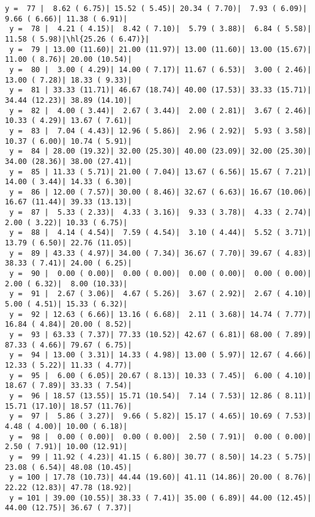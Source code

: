 \documentclass[10pt]{article}
\newcommand{\hl}[1]{\textcolor{blue}{#1}}
\begin{document}
\begin{Verbatim}[fontsize=\small, commandchars=\\\{\}]
 y =  77 |  8.62 ( 6.75)| 15.52 ( 5.45)| 20.34 ( 7.70)|  7.93 ( 6.09)|  9.66 ( 6.66)| 11.38 ( 6.91)|
 y =  78 |  4.21 ( 4.15)|  8.42 ( 7.10)|  5.79 ( 3.88)|  6.84 ( 5.58)| 11.58 ( 5.98)|\hl{25.26 ( 6.47)}|
 y =  79 | 13.00 (11.60)| 21.00 (11.97)| 13.00 (11.60)| 13.00 (15.67)| 11.00 ( 8.76)| 20.00 (10.54)|
 y =  80 |  3.00 ( 4.29)| 14.00 ( 7.17)| 11.67 ( 6.53)|  3.00 ( 2.46)| 13.00 ( 7.28)| 18.33 ( 9.33)|
 y =  81 | 33.33 (11.71)| 46.67 (18.74)| 40.00 (17.53)| 33.33 (15.71)| 34.44 (12.23)| 38.89 (14.10)|
 y =  82 |  4.00 ( 3.44)|  2.67 ( 3.44)|  2.00 ( 2.81)|  3.67 ( 2.46)| 10.33 ( 4.29)| 13.67 ( 7.61)|
 y =  83 |  7.04 ( 4.43)| 12.96 ( 5.86)|  2.96 ( 2.92)|  5.93 ( 3.58)| 10.37 ( 6.00)| 10.74 ( 5.91)|
 y =  84 | 28.00 (19.32)| 32.00 (25.30)| 40.00 (23.09)| 32.00 (25.30)| 34.00 (28.36)| 38.00 (27.41)|
 y =  85 | 11.33 ( 5.71)| 21.00 ( 7.04)| 13.67 ( 6.56)| 15.67 ( 7.21)| 14.00 ( 3.44)| 14.33 ( 6.30)|
 y =  86 | 12.00 ( 7.57)| 30.00 ( 8.46)| 32.67 ( 6.63)| 16.67 (10.06)| 16.67 (11.44)| 39.33 (13.13)|
 y =  87 |  5.33 ( 2.33)|  4.33 ( 3.16)|  9.33 ( 3.78)|  4.33 ( 2.74)|  2.00 ( 3.22)| 10.33 ( 6.75)|
 y =  88 |  4.14 ( 4.54)|  7.59 ( 4.54)|  3.10 ( 4.44)|  5.52 ( 3.71)| 13.79 ( 6.50)| 22.76 (11.05)|
 y =  89 | 43.33 ( 4.97)| 34.00 ( 7.34)| 36.67 ( 7.70)| 39.67 ( 4.83)| 38.33 ( 7.41)| 24.00 ( 6.25)|
 y =  90 |  0.00 ( 0.00)|  0.00 ( 0.00)|  0.00 ( 0.00)|  0.00 ( 0.00)|  2.00 ( 6.32)|  8.00 (10.33)|
 y =  91 |  2.67 ( 3.06)|  4.67 ( 5.26)|  3.67 ( 2.92)|  2.67 ( 4.10)|  5.00 ( 4.51)| 15.33 ( 6.32)|
 y =  92 | 12.63 ( 6.66)| 13.16 ( 6.68)|  2.11 ( 3.68)| 14.74 ( 7.77)| 16.84 ( 4.84)| 20.00 ( 8.52)|
 y =  93 | 63.33 ( 7.37)| 77.33 (10.52)| 42.67 ( 6.81)| 68.00 ( 7.89)| 87.33 ( 4.66)| 79.67 ( 6.75)|
 y =  94 | 13.00 ( 3.31)| 14.33 ( 4.98)| 13.00 ( 5.97)| 12.67 ( 4.66)| 12.33 ( 5.22)| 11.33 ( 4.77)|
 y =  95 |  6.00 ( 6.05)| 20.67 ( 8.13)| 10.33 ( 7.45)|  6.00 ( 4.10)| 18.67 ( 7.89)| 33.33 ( 7.54)|
 y =  96 | 18.57 (13.55)| 15.71 (10.54)|  7.14 ( 7.53)| 12.86 ( 8.11)| 15.71 (17.10)| 18.57 (11.76)|
 y =  97 |  5.86 ( 3.27)|  9.66 ( 5.82)| 15.17 ( 4.65)| 10.69 ( 7.53)|  4.48 ( 4.00)| 10.00 ( 6.18)|
 y =  98 |  0.00 ( 0.00)|  0.00 ( 0.00)|  2.50 ( 7.91)|  0.00 ( 0.00)|  2.50 ( 7.91)| 10.00 (12.91)|
 y =  99 | 11.92 ( 4.23)| 41.15 ( 6.80)| 30.77 ( 8.50)| 14.23 ( 5.75)| 23.08 ( 6.54)| 48.08 (10.45)|
 y = 100 | 17.78 (10.73)| 44.44 (19.60)| 41.11 (14.86)| 20.00 ( 8.76)| 22.22 (12.83)| 47.78 (18.92)|
 y = 101 | 39.00 (10.55)| 38.33 ( 7.41)| 35.00 ( 6.89)| 44.00 (12.45)| 44.00 (12.75)| 36.67 ( 7.37)|
\end{Verbatim}
\end{document}
